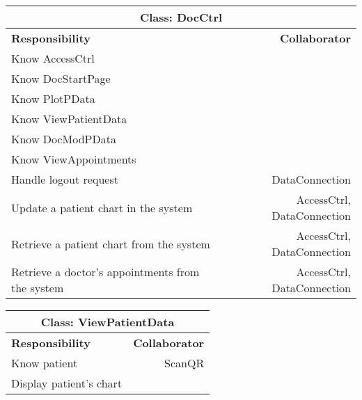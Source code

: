 \documentclass[12pt]{article}
\begin{document}
\begin{center}
\begin{tabularx}{\textwidth}{|X|r|} \hline
\multicolumn{2}{|c|}{\textbf{Class: DocCtrl}}\\ \hline
\textbf{Responsibility} & \textbf{Collaborator} \\ \hline
Know AccessCtrl                             &                                  \\ \hline 
Know DocStartPage                  &                             \\ \hline
Know PlotPData                  &                             \\ \hline
Know ViewPatientData                              &                                 \\ \hline
Know DocModPData                                  &                                 \\ \hline
Know ViewAppointments                                   &                                 \\ \hline
Handle logout request                                 &  DataConnection                                 \\ \hline
Update a patient chart in the system & AccessCtrl, DataConnection \\ \hline
Retrieve a patient chart from the system & AccessCtrl, DataConnection\\ \hline
Retrieve a doctor's appointments from the system & AccessCtrl, DataConnection\\ \hline
\end{tabularx}
\newline\newline
\end{center}

\begin{center}
\begin{tabularx}{\textwidth}{|X|r|} \hline
\multicolumn{2}{|c|}{\textbf{Class: ViewPatientData}}\\ \hline
\textbf{Responsibility} & \textbf{Collaborator} \\ \hline
Know patient & ScanQR \\ \hline
Display patient's chart & \\ \hline
\end{tabularx}
\newline\newline
\end{center}
\end{document}
